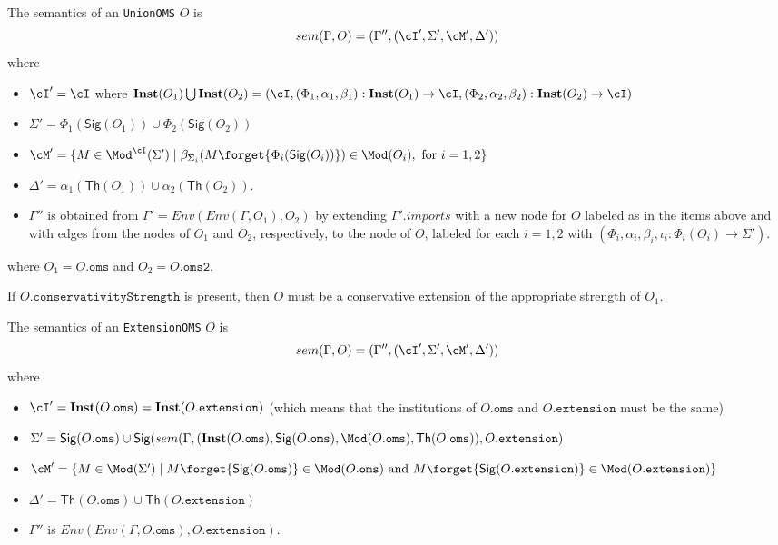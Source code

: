 \documentclass[10pt, a4paper]{isov2}
\newcommand*{\syntax}[1]{\texttt{#1}}
\newcommand{\Sig}{\mathsf{Sig}}
\renewcommand{\Th}{\mathsf{Th}}
\newcommand{\Inst}{\ensuremath{\mathbf{Inst}}}
\begin{document}
The semantics of an \syntax{UnionOMS} $O$ is
$$sem(\Gamma, O) = (\Gamma'',(\cI',\Sigma',\cM',\Delta'))$$
\noindent where
\begin{itemize}
  \item $\cI' = \cI$ where
    $\Inst(O_1) \bigcup \Inst(O_2) =(\cI, (\Phi_1, \alpha_1,\beta_1) : \Inst(O_1) \rightarrow \cI,
                    (\Phi_2, \alpha_2,\beta_2) : \Inst(O_2) \rightarrow \cI)$
  \item $\Sigma' = \Phi_1(\Sig(O_1)) \cup \Phi_2(\Sig(O_2))$
  \item $\cM' = \{ M\in \Mod^\cI(\Sigma') \mid \beta_{\Sigma_i}(M\forget{\Phi_i(\Sig(O_i))}) \in \Mod(O_i), \text{ for } i=1,2 \}$
  \item $\Delta' = \alpha_1(\Th(O_1)) \cup \alpha_2(\Th(O_2))$.
    \item
        $\Gamma''$ is obtained from
       $\Gamma' = Env(Env(\Gamma,O_1), O_2)$
       by extending $\Gamma'.imports$
       with a new node for $O$ labeled as in the items above and
       with edges from the nodes of $O_1$ and $O_2$,
       respectively, to the node of $O$,
        labeled for each $i=1,2$ with
        $(\Phi_i, \alpha_i,\beta_i, \iota_i: \Phi_i(O_i) \to \Sigma')$.
\end{itemize}
where $O_1 = O.\syntax{oms}$ and $O_2 = O.\syntax{oms2}$.

If $O.\syntax{conservativityStrength}$ is present, then $O$ must be a conservative extension
of the appropriate strength of $O_1$.


The semantics of an \syntax{ExtensionOMS} $O$ is
$$sem(\Gamma, O) = (\Gamma'',(\cI',\Sigma',\cM',\Delta'))$$
\noindent where
\begin{itemize}
  \item $\cI' = \Inst(O.\syntax{oms}) = \Inst(O.\syntax{extension})$
  (which means that
  the institutions of $O.\syntax{oms}$ and
  $O.\syntax{extension}$ must be the same)
  \item $\Sigma' = \Sig(O.\syntax{oms}) \cup
  \Sig(sem(\Gamma,
       (\Inst(O.\syntax{oms}), \Sig(O.\syntax{oms}), \Mod(O.\syntax{oms}), \Th(O.\syntax{oms}) ),
  O.\syntax{extension})$
  \item $\cM' = \{ M\in \Mod(\Sigma') \mid M\forget{\Sig(O.\syntax{oms})} \in \Mod(O.\syntax{oms})
  \text{ and }
  M \forget{\Sig(O.\syntax{extension})} \in \Mod(O.\syntax{extension})\}$
  \item $\Delta' = \Th(O.\syntax{oms}) \cup \Th(O.\syntax{extension})$
  \item $\Gamma''$ is $Env(Env(\Gamma, O.\syntax{oms}), O.\syntax{extension})$.
\end{itemize}
\end{document}
